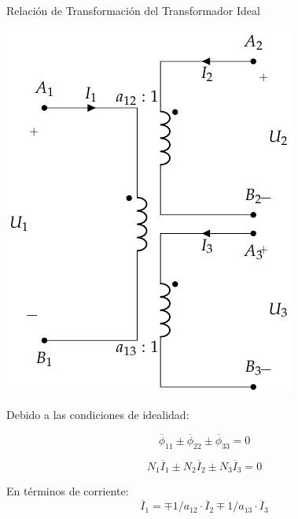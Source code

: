 \documentclass[aspectratio=169, usenames,svgnames,dvipsnames]{beamer}
\begin{document}
\begin{frame}[label={sec:org1399608}]{Relación de Transformación del Transformador Ideal}
\begin{center}
\includegraphics[height=0.35\textheight]{../figs/TrafoIdealVariosDevanados.pdf}
\end{center}

Debido a las condiciones de idealidad:

\[
  \overline{\phi}_{11} \pm \overline{\phi}_{22} \pm \overline{\phi}_{33} = 0
\]

\[
  N_1 \overline{I}_1 \pm N_ 2\overline{I}_2 \pm N_3 \overline{I}_{3} = 0
\]

En términos de corriente:
\[
  \boxed{\overline{I}_1 = \mp 1/a_{12} \cdot \overline{I}_2 \mp 1/a_{13} \cdot  \overline{I}_3}
\]
\end{frame}
\end{document}
